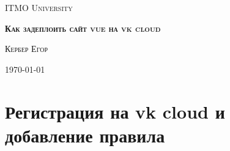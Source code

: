 \documentclass[14pt, a4paper]{extarticle}
\begin{document}
\begin{titlepage}
    \centering
    \par
    {\scshape ITMO University\par}
    \vspace{80mm}
    {\Large\bfseries\scshape Как задеплоить сайт vue на vk cloud\par}
    \vspace{20mm}
    {\scshape Кербер Егор\par}
    \vfill
    {\scshape\today\par}
\end{titlepage}

\setcounter{page}{2}
\tableofcontents
\newpage

\section{Регистрация на vk cloud и добавление правила}
\end{document}
